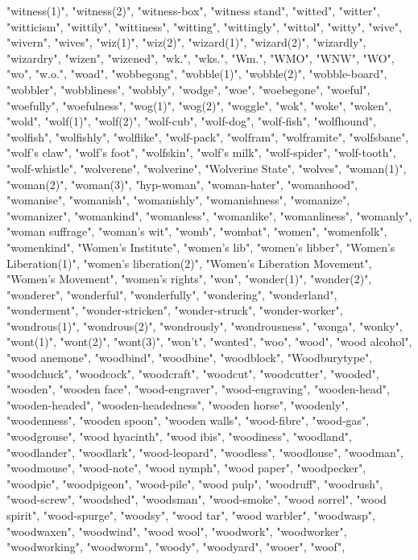 "witness(1)",
"witness(2)",
"witness-box",
"witness stand",
"witted",
"witter",
"witticism",
"wittily",
"wittiness",
"witting",
"wittingly",
"wittol",
"witty",
"wive",
"wivern",
"wives",
"wiz(1)",
"wiz(2)",
"wizard(1)",
"wizard(2)",
"wizardly",
"wizardry",
"wizen",
"wizened",
"wk.",
"wks.",
"Wm.",
"WMO",
"WNW",
"WO",
"wo",
"w.o.",
"woad",
"wobbegong",
"wobble(1)",
"wobble(2)",
"wobble-board",
"wobbler",
"wobbliness",
"wobbly",
"wodge",
"woe",
"woebegone",
"woeful",
"woefully",
"woefulness",
"wog(1)",
"wog(2)",
"woggle",
"wok",
"woke",
"woken",
"wold",
"wolf(1)",
"wolf(2)",
"wolf-cub",
"wolf-dog",
"wolf-fish",
"wolfhound",
"wolfish",
"wolfishly",
"wolflike",
"wolf-pack",
"wolfram",
"wolframite",
"wolfsbane",
"wolf's claw",
"wolf's foot",
"wolfskin",
"wolf's milk",
"wolf-spider",
"wolf-tooth",
"wolf-whistle",
"wolverene",
"wolverine",
"Wolverine State",
"wolves",
"woman(1)",
"woman(2)",
"woman(3)",
"hyp-woman",
"woman-hater",
"womanhood",
"womanise",
"womanish",
"womanishly",
"womanishness",
"womanize",
"womanizer",
"womankind",
"womanless",
"womanlike",
"womanliness",
"womanly",
"woman suffrage",
"woman's wit",
"womb",
"wombat",
"women",
"womenfolk",
"womenkind",
"Women's Institute",
"women's lib",
"women's libber",
"Women's Liberation(1)",
"women's liberation(2)",
"Women's Liberation Movement",
"Women's Movement",
"women's rights",
"won",
"wonder(1)",
"wonder(2)",
"wonderer",
"wonderful",
"wonderfully",
"wondering",
"wonderland",
"wonderment",
"wonder-stricken",
"wonder-struck",
"wonder-worker",
"wondrous(1)",
"wondrous(2)",
"wondrously",
"wondrousness",
"wonga",
"wonky",
"wont(1)",
"wont(2)",
"wont(3)",
"won't",
"wonted",
"woo",
"wood",
"wood alcohol",
"wood anemone",
"woodbind",
"woodbine",
"woodblock",
"Woodburytype",
"woodchuck",
"woodcock",
"woodcraft",
"woodcut",
"woodcutter",
"wooded",
"wooden",
"wooden face",
"wood-engraver",
"wood-engraving",
"wooden-head",
"wooden-headed",
"wooden-headedness",
"wooden horse",
"woodenly",
"woodenness",
"wooden spoon",
"wooden walls",
"wood-fibre",
"wood-gas",
"woodgrouse",
"wood hyacinth",
"wood ibis",
"woodiness",
"woodland",
"woodlander",
"woodlark",
"wood-leopard",
"woodless",
"woodlouse",
"woodman",
"woodmouse",
"wood-note",
"wood nymph",
"wood paper",
"woodpecker",
"woodpie",
"woodpigeon",
"wood-pile",
"wood pulp",
"woodruff",
"woodrush",
"wood-screw",
"woodshed",
"woodsman",
"wood-smoke",
"wood sorrel",
"wood spirit",
"wood-spurge",
"woodsy",
"wood tar",
"wood warbler",
"woodwasp",
"woodwaxen",
"woodwind",
"wood wool",
"woodwork",
"woodworker",
"woodworking",
"woodworm",
"woody",
"woodyard",
"wooer",
"woof",
